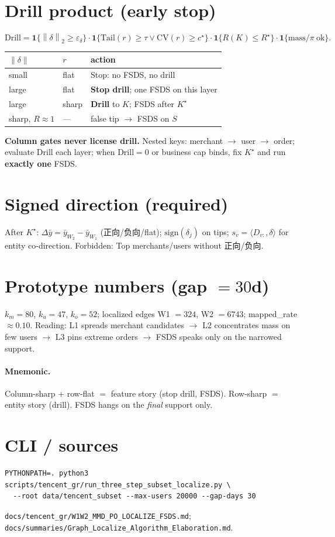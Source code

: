 \documentclass[11pt]{article}
\newcommand{\norm}[1]{\left\|#1\right\|_2}
\newcommand{\Drill}{\mathrm{Drill}}
\newcommand{\Tail}{\mathrm{Tail}}
\newcommand{\CV}{\mathrm{CV}}
\begin{document}
\section{Drill product (early stop)}
\begin{equation}
  \Drill
  =
  \mathbf{1}\{\norm{\delta}\ge\varepsilon_\delta\}
  \cdot
  \mathbf{1}\{\Tail(r)\ge\tau\lor\CV(r)\ge c^\star\}
  \cdot
  \mathbf{1}\{R(K)\le R^\star\}
  \cdot
  \mathbf{1}\{\mathrm{mass}/\pi\ \mathrm{ok}\}.
\end{equation}
\begin{center}
\begin{tabular}{lll}
\toprule
$\|\delta\|$ & $r$ & action \\
\midrule
small & flat & Stop: no FSDS, no drill \\
large & flat & \textbf{Stop drill}; one FSDS on this layer \\
large & sharp & \textbf{Drill} to $K$; FSDS after $K^\star$ \\
sharp, $R\approx 1$ & --- & false tip $\to$ FSDS on $S$ \\
\bottomrule
\end{tabular}
\end{center}
\textbf{Column gates never license drill.} Nested keys:
merchant $\to$ user $\to$ order; evaluate Drill each layer;
when $\Drill=0$ or business cap binds, fix $K^\star$ and run
\textbf{exactly one} FSDS.

\section{Signed direction (required)}
After $K^\star$:
$\Delta\bar y=\bar y_{W_2}-\bar y_{W_1}$ (正向/负向/flat);
$\mathrm{sign}(\delta_j)$ on tips;
$s_v=\langle D_{v:},\delta\rangle$ for entity co-direction.
Forbidden: Top merchants/users without 正向/负向.

\section{Prototype numbers (gap $=30$d)}
$k_m{=}80$, $k_u{=}47$, $k_o{=}52$;
localized edges W1 $=324$, W2 $=6743$;
mapped\_rate $\approx 0.10$.
Reading: L1 spreads merchant candidates $\to$ L2 concentrates mass on
few users $\to$ L3 pins extreme orders $\to$ FSDS speaks only on the
narrowed support.

\paragraph{Mnemonic.}
Column-sharp + row-flat $=$ feature story (stop drill, FSDS).
Row-sharp $=$ entity story (drill).
FSDS hangs on the \emph{final} support only.

\section{CLI / sources}
\begin{verbatim}
PYTHONPATH=. python3 scripts/tencent_gr/run_three_step_subset_localize.py \
  --root data/tencent_subset --max-users 20000 --gap-days 30
\end{verbatim}
\texttt{docs/tencent\_gr/W1W2\_MMD\_PO\_LOCALIZE\_FSDS.md};
\texttt{docs/summaries/Graph\_Localize\_Algorithm\_Elaboration.md}.
\end{document}
